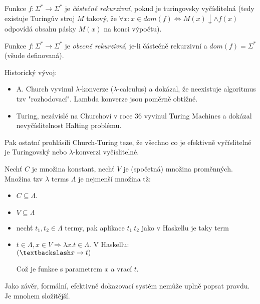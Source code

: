 \begin{definition}
    Funkce $f: \Sigma^*\rightarrow\Sigma^*$ je \emph{částečně rekurzivní}, pokud je turingovsky vyčíslitelná (tedy existuje Turingův stroj $M$ takový, že $\forall x: x\in dom(f)\Leftrightarrow M(x)\downarrow \land f(x)$ odpovídá obsahu pásky $M(x)$ na konci výpočtu).

    Funkce $f: \Sigma^*\to \Sigma^*$ je \emph{obecně rekurzivní}, je-li částečně rekurzivní a $dom(f)=\Sigma^*$ (všude definovaná).
\end{definition}

\begin{note}
	Historický vývoj:
	\begin{itemize}
		\item A. Church vyvinul $\lambda$-konverze ($\lambda$-calculus) a dokázal, že neexistuje algoritmus tzv "rozhodovací".
		Lambda konverze jsou poměrně obtížné.
		\item Turing, nezávislé na Churchoví v roce 36 vyvinul Turing Machines a dokázal nevyčíslitelnost Halting problému.
	\end{itemize}

	Pak ostatní prohlásili Church-Turing teze, že všechno co je efektivně vyčíslitelné je Turingovský nebo $\lambda$-konverzi vyčíslitelné.
\end{note}

\begin{definition}
	Nechť $C$ je množina konstant, nechť $V$ je (spočetná) množina proměnných.
	Množina tzv $\lambda$ terms $\Lambda$ je nejmenší množina tž:
	\begin{itemize}
		\item $C \subseteq \Lambda$.
		\item $V \subseteq \Lambda$
		\item nechť $t_1, t_2 \in \Lambda$ termy, pak aplikace $t_1\ t_2$ jako v Haskellu je taky term
		\item $t \in \Lambda, x \in V \Rightarrow \lambda x . t \in \Lambda$.
			V Haskellu:\\ $(\textbackslash x \to t)$

			Což je funkce s parametrem $x$ a vrací $t$.
	\end{itemize}
\end{definition}

Jako závěr, formální, efektivně dokazovací systém nemůže uplně popsat pravdu. Je mnohem složitější.

